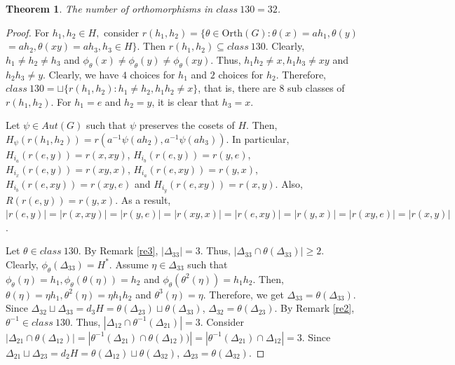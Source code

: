 \documentclass[11pt,a4paper]{article}
\newtheorem{theorem}{Theorem}[section]
\theoremstyle{definition}
\theoremstyle{remark}
\begin{document}
	\begin{theorem}\label{th3}
		The number of orthomorphisms in	$class~130 = 32$.
	\end{theorem}
	\begin{proof}
			For $h_{1},h_{2} \in H,$ consider $r(h_{1},h_{2}) =  \{\theta \in \text{Orth}(G): \theta(x)=ah_{1}, \theta(y)$ $ = ah_{2}, \theta(xy) = ah_{3}, h_{3} \in H\}$. Then $r(h_{1},h_{2}) \subseteq class~130$. Clearly, $h_{1} \neq h_{2} \neq h_{3}$ and $\phi_{\theta}(x) \neq \phi_{\theta}(y) \neq \phi_{\theta}(xy).$ Thus, $h_{1}h_{2} \neq x, h_{1}h_{3} \neq xy$ and $h_{2}h_{3} \neq y$. Clearly, we have $4$ choices for $h_{1}$ and $2$ choices for $h_{2}$. Therefore, $class~130 = \sqcup \{r(h_{1},h_{2}) : h_{1} \neq h_{2}, h_{1}h_{2} \neq x\}$, that is, there are $8$ sub classes of $r(h_{1},h_{2})$. For $h_{1} = e$ and $h_{2} = y$, it is clear that $h_{3} = x$.
			
			  Let $\psi \in Aut(G)$ such that $\psi$ preserves the cosets of $H$. Then, $H_{\psi}(r(h_{1},h_{2})) = r(a^{-1}\psi(ah_{2}), a^{-1}\psi(ah_{3}))$. In particular,
		$H_{i_{a}}(r(e,y)) = r(x,xy)$,
		$H_{i_{b}}(r(e,y)) = r(y,e)$,
		$H_{i_{x}}(r(e,y)) = r(xy,x)$,
		 $H_{i_{a}}(r(e,xy)) = r(y,x)$, $H_{i_{b}}(r(e,xy)) = r(xy,e)$ and $H_{i_{y}}(r(e,xy)) = r(x,y)$. Also,  $R(r(e,y)) = r(y,x)$. As a result, $|r(e,y)| = |r(x,xy)| = |r(y,e)| = |r(xy,x)| = |r(e,xy)| = |r(y,x)| = |r(xy,e)| = |r(x,y)|$. 
		
	
		Let $\theta \in class~130.$ By Remark \ref{re3}, $\vert \Delta_{33} \vert = 3$. Thus, $\vert \Delta_{33} \cap \theta(\Delta_{33}) \vert \geq 2$. Clearly, $\phi_{\theta}(\Delta_{33}) = H^{\ast}.$ Assume $\eta \in \Delta_{33}$ such that $\phi_{\theta}(\eta) = h_{1}, \phi_{\theta}(\theta(\eta)) = h_{2}$ and $\phi_{\theta}(\theta^{2}(\eta))=h_{1}h_{2}.$ Then, $\theta(\eta) = \eta h_{1}, \theta^{2}(\eta) = \eta h_{1}h_{2}$ and $\theta^{3}(\eta) = \eta$. Therefore, we get $ \Delta_{33} = \theta(\Delta_{33})$. Since $\Delta_{32} \sqcup \Delta_{33} = d_{3}H = \theta(\Delta_{23}) \sqcup \theta(\Delta_{33})$,  $\Delta_{32} = \theta(\Delta_{23})$. By Remark \ref{re2}, $\theta^{-1} \in class~130.$ Thus, $|\Delta_{12} \cap \theta^{-1}(\Delta_{21})| = 3$. Consider $|\Delta_{21} \cap \theta(\Delta_{12})| = |\theta^{-1}(\Delta_{21}) \cap \theta(\Delta_{12}))|= |\theta^{-1}(\Delta_{21}) \cap \Delta_{12}| = 3$. Since $\Delta_{21}\sqcup \Delta_{23} = d_{2}H = \theta(\Delta_{12}) \sqcup \theta(\Delta_{32})$,   $\Delta_{23} = \theta(\Delta_{32}).$
		

\end{proof}
\end{document}
